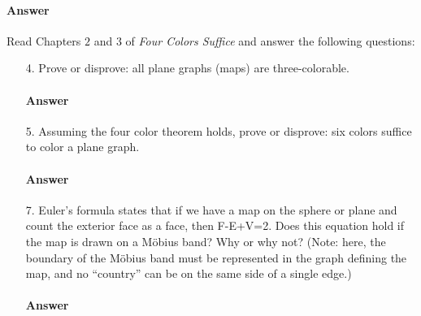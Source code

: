 \documentclass{article}
\begin{document}
\paragraph{Answer}


\collab{\todo{}}
Read Chapters $2$ and $3$ of \emph{Four Colors Suffice} and answer the following questions:

\begin{enumerate}
    \item[4.] Prove or disprove: all plane graphs (maps) are three-colorable.

        \paragraph{Answer}
        \todo{}

    \item[5.] Assuming the four color theorem holds, prove or disprove: six colors
        suffice to color a plane graph.

        \paragraph{Answer}
        \todo{}

    \item[7.] Euler's formula states that if we have a map on the sphere or plane
        and count the exterior face as a face, then F-E+V=2.  Does this equation
        hold if the map is drawn on a M\"obius band? Why or why not? (Note:
        here, the boundary of the M\"obius band must be represented in the graph
        defining the map, and no ``country'' can be on the same side of a single
        edge.)

        \paragraph{Answer}

\end{enumerate}




\collab{\todo{}} 
\end{document}
